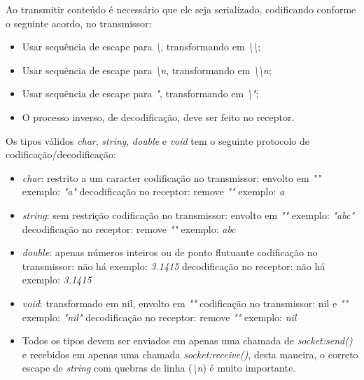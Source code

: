 \documentclass[11pt]{article}
\begin{document}
Ao transmitir conteúdo é necessário que ele seja serializado, codificando
conforme o seguinte acordo, no transmissor:

\begin{itemize}
\item
Usar sequência de escape para \textit{\textbackslash{}}, transformando em \textit{\textbackslash{}\textbackslash{}};
\item
Usar sequência de escape para \textit{\textbackslash{}n}, transformando em \textit{\textbackslash{}\textbackslash{}n};
\item
Usar sequência de escape para \textit{"}, transformando em \textit{\textbackslash{}"};
\item
O processo inverso, de decodificação, deve ser feito no receptor.
\end{itemize}

Os tipos válidos \textit{char}, \textit{string}, \textit{double} e
\textit{void} tem o seguinte protocolo de
codificação/decodificação:

\begin{itemize}
\item
\textit{char}: restrito a um caracter
codificação no transmissor: envolto em \textit{""}
exemplo: \textit{"a"}
decodificação no receptor: remove \textit{""}
exemplo: \textit{a}
\item
\textit{string}: sem restrição
codificação no transmissor: envolto em \textit{""}
exemplo: \textit{"abc"}
decodificação no receptor: remove \textit{""}
exemplo: \textit{abc}
\item
\textit{double}: apenas números inteiros ou de ponto flutuante
codificação no transmissor: não há
exemplo: \textit{3.1415}
decodificação no receptor: não há
exemplo: \textit{3.1415}
\item
\textit{void}: transformado em nil, envolto em \textit{""}
codificação no transmissor: nil e \textit{""}
exemplo: \textit{"nil"}
decodificação no receptor: remove \textit{""}
exemplo: \textit{nil}
\item
Todos os tipos devem ser enviados em apenas uma chamada de \textit{socket:send()}
e recebidos em apenas uma chamada \textit{socket:receive()}, desta maneira, o
correto escape de \textit{string} com quebras de linha (\textit{\textbackslash{}n}) é muito importante.
\end{itemize}
\end{document}
